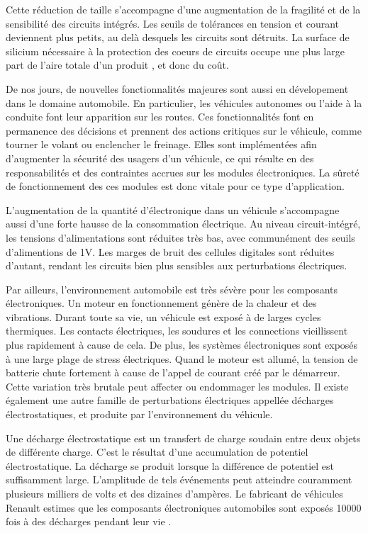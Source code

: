 Cette réduction de taille s'accompagne d'une augmentation de la fragilité et de la sensibilité des circuits intégrés.
Les seuils de tolérances en tension et courant deviennent plus petits, au delà desquels les circuits sont détruits.
La surface de silicium nécessaire à la protection des coeurs de circuits occupe une plus large part de l'aire totale d'un produit  \cite{evolution_technologies}, et donc du coût.

De nos jours, de nouvelles fonctionnalités majeures sont aussi en dévelopement dans le domaine automobile.
En particulier, les véhicules autonomes ou l'aide à la conduite font leur apparition sur les routes.
Ces fonctionnalités font en permanence des décisions et prennent des actions critiques sur le véhicule, comme tourner le volant ou enclencher le freinage.
Elles sont implémentées afin d'augmenter la sécurité des usagers d'un véhicule, ce qui résulte en des responsabilités et des contraintes accrues sur les modules électroniques.
La sûreté de fonctionnement des ces modules est donc vitale pour ce type d'application.

L'augmentation de la quantité d'électronique dans un véhicule s'accompagne aussi d'une forte hausse de la consommation électrique.
Au niveau circuit-intégré, les tensions d'alimentations sont réduites très bas, avec communément des seuils d'alimentions de 1V.
Les marges de bruit des cellules digitales sont réduites d'autant, rendant les circuits bien plus sensibles aux perturbations électriques.

Par ailleurs, l'environnement automobile est très sévère pour les composants électroniques.
Un moteur en fonctionnement génère de la chaleur et des vibrations.
Durant toute sa vie, un véhicule est exposé à de larges cycles thermiques.
Les contacts électriques, les soudures et les connections vieillissent plus rapidement à cause de cela.
De plus, les systèmes électroniques sont exposés à une large plage de stress électriques.
Quand le moteur est allumé, la tension de batterie chute fortement à cause de l'appel de courant créé par le démarreur.
Cette variation très brutale peut affecter ou endommager les modules.
Il existe également une autre famille de perturbations électriques appellée décharges électrostatiques, et produite par l'environnement du véhicule.

Une décharge électrostatique est un transfert de charge soudain entre deux objets de différente charge.
C'est le résultat d'une accumulation de potentiel électrostatique.
La décharge se produit lorsque la différence de potentiel est suffisamment large.
L'amplitude de tels événements peut atteindre couramment plusieurs milliers de volts et des dizaines d'ampères.
Le fabricant de véhicules Renault estimes que les composants électroniques automobiles sont exposés 10000 fois à des décharges pendant leur vie \cite{Renault-esd}.


